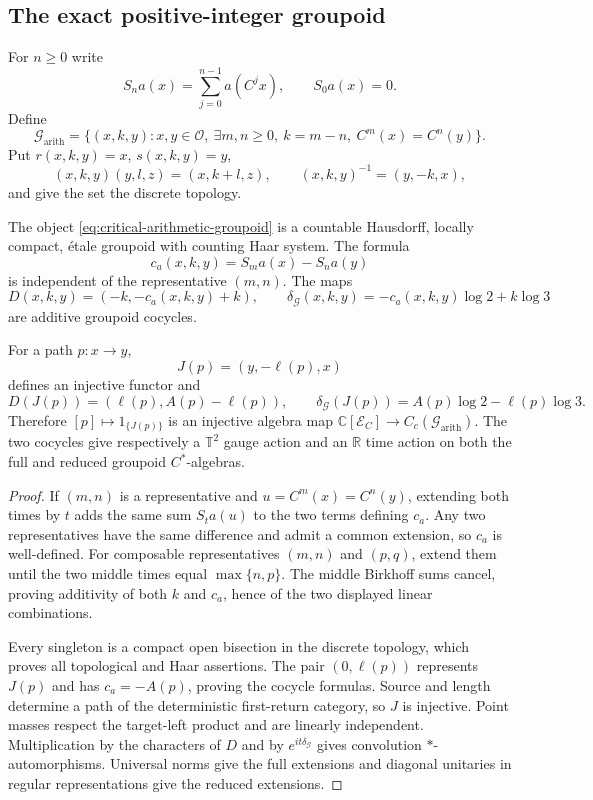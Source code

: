 \subsection{The exact positive-integer groupoid}

For $n\geq0$ write
\[
 S_na(x)=\sum_{j=0}^{n-1}a(C^jx),\qquad S_0a(x)=0.
\]
Define
\begin{equation}
\label{eq:critical-arithmetic-groupoid}
 \mathcal G_{\mathrm{arith}}
 =\{(x,k,y):x,y\in\mathcal O,\ \exists m,n\geq0,\
 k=m-n,\ C^m(x)=C^n(y)\}.
\end{equation}
Put $r(x,k,y)=x$, $s(x,k,y)=y$,
\[
 (x,k,y)(y,l,z)=(x,k+l,z),
 \qquad (x,k,y)^{-1}=(y,-k,x),
\]
and give the set the discrete topology.

\begin{theorem}
\label{thm:critical-arithmetic-groupoid}
The object \eqref{eq:critical-arithmetic-groupoid} is a countable Hausdorff,
locally compact, \'{e}tale groupoid with counting Haar system.  The formula
\[
 c_a(x,k,y)=S_ma(x)-S_na(y)
\]
is independent of the representative $(m,n)$.  The maps
\begin{equation}
\label{eq:critical-groupoid-cocycles}
 D(x,k,y)=(-k,-c_a(x,k,y)+k),
 \qquad
 \delta_{\mathcal G}(x,k,y)=-c_a(x,k,y)\log2+k\log3
\end{equation}
are additive groupoid cocycles.

For a path $p:x\to y$,
\[
 J(p)=(y,-\ell(p),x)
\]
defines an injective functor and
\[
 D(J(p))=(\ell(p),A(p)-\ell(p)),\qquad
 \delta_{\mathcal G}(J(p))=A(p)\log2-\ell(p)\log3.
\]
Therefore $[p]\mapsto1_{\{J(p)\}}$ is an injective algebra map
$\mathbb C[\mathcal E_C]\to C_c(\mathcal G_{\mathrm{arith}})$.
The two cocycles give respectively a $\mathbb T^2$ gauge action and an
$\mathbb R$ time action on both the full and reduced groupoid
$C^*$-algebras.
\end{theorem}

\begin{proof}
If $(m,n)$ is a representative and $u=C^m(x)=C^n(y)$, extending both times
by $t$ adds the same sum $S_ta(u)$ to the two terms defining $c_a$.  Any two
representatives have the same difference and admit a common extension, so
$c_a$ is well-defined.  For composable representatives $(m,n)$ and $(p,q)$,
extend them until the two middle times equal $\max\{n,p\}$.  The middle
Birkhoff sums cancel, proving additivity of both $k$ and $c_a$, hence of the
two displayed linear combinations.

Every singleton is a compact open bisection in the discrete topology, which
proves all topological and Haar assertions.  The pair $(0,\ell(p))$
represents $J(p)$ and has $c_a=-A(p)$, proving the cocycle formulas.  Source
and length determine a path of the deterministic first-return category, so
$J$ is injective.  Point masses respect the target-left product and are
linearly independent.  Multiplication by the characters of $D$ and by
$e^{it\delta_{\mathcal G}}$ gives convolution $*$-automorphisms.  Universal
norms give the full extensions and diagonal unitaries in regular
representations give the reduced extensions.
\end{proof}


